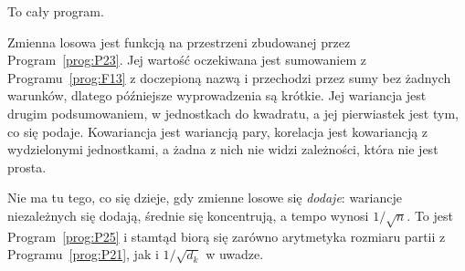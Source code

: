 \begin{fr}
To cały program.

Zmienna losowa jest funkcją na przestrzeni zbudowanej przez
Program~\ref{prog:P23}. Jej wartość oczekiwana jest sumowaniem z
Programu~\ref{prog:F13} z doczepioną nazwą i przechodzi przez sumy bez żadnych
warunków, dlatego późniejsze wyprowadzenia są krótkie. Jej wariancja jest
drugim podsumowaniem, w jednostkach do kwadratu, a jej pierwiastek jest tym,
co się podaje. Kowariancja jest wariancją pary, korelacja jest kowariancją z
wydzielonymi jednostkami, a żadna z nich nie widzi zależności, która nie jest
prosta.

Nie ma tu tego, co się dzieje, gdy zmienne losowe się \emph{dodaje}: wariancje
niezależnych się dodają, średnie się koncentrują, a tempo wynosi
$1/\sqrt{n}$. To jest Program~\ref{prog:P25} i stamtąd biorą się zarówno
arytmetyka rozmiaru partii z Programu~\ref{prog:P21}, jak i $1/\sqrt{d_k}$ w
uwadze.

\end{fr}

